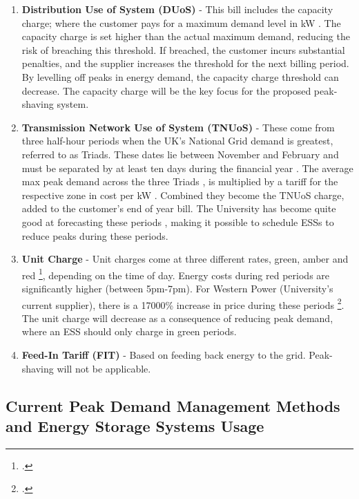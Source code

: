 \begin{enumerate}
\item \textbf{Distribution Use of System (DUoS)} - This bill includes the capacity charge; where the customer pays for a maximum demand level in kW \cite{Deconstr52:online}. The capacity charge is set higher than the actual maximum demand, reducing the risk of breaching this threshold. If breached, the customer incurs substantial penalties, and the supplier increases the threshold for the next billing period. By levelling off peaks in energy demand, the capacity charge threshold can decrease. The capacity charge will be the key focus for the proposed peak-shaving system.
\item \textbf{Transmission Network Use of System (TNUoS)} - These come from three half-hour periods when the UK's National Grid demand is greatest, referred to as Triads. These dates lie between November and February and must be separated by at least ten days during the financial year \cite{TriadsWh7:online}. The average max peak demand across the three Triads \cite{TNUoSTra99:online}, is multiplied by a tariff for the respective zone in cost per kW \cite{TNUoScha93:online}. Combined they become the TNUoS charge, added to the customer's end of year bill. The University has become quite good at forecasting these periods \cite{Jbrentmeet}, making it possible to schedule ESSs to reduce peaks during these periods.
\item \textbf{Unit Charge} - Unit charges come at three different rates, green, amber and red \footcite[See page 27 of][]{SWEB201492:online}, depending on the time of day. Energy costs during red periods are significantly higher (between 5pm-7pm). For Western Power (University's current supplier), there is a 17000\% increase in price during these periods \footcite[25.405 p/kWh in red periods against 0.147p/kWh in green periods][]{SWEB201492:online}. The unit charge will decrease as a consequence of reducing peak demand, where an ESS should only charge in green periods.
\item \textbf{Feed-In Tariff (FIT)} - Based on feeding back energy to the grid. Peak-shaving will not be applicable.
\end{enumerate}

\subsection{Current Peak Demand Management Methods and Energy Storage
Systems
Usage}\label{current-peak-demand-management-methods-and-energy-storage-systems-usage}

